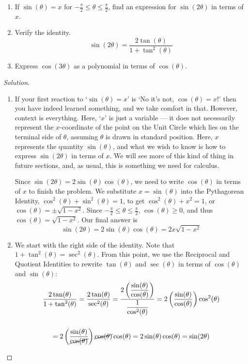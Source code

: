 \documentclass{ximera}
\begin{document}
\begin{example}
  \label{doubleangleex} $~$
  \begin{enumerate}
    \item If \( \sin(\theta) = x \) for \( -\frac{\pi}{2} \leq \theta \leq \frac{\pi}{2} \), find an expression for \( \sin(2\theta) \) in terms of \( x \).
    \item  \label{doubleanglesinewtan} Verify the identity.
    \[
      \sin(2\theta) = \frac{2\tan(\theta)}{1 + \tan^{2}(\theta)}
    \]
    \item \label{cosinepolynomial} Express \( \cos(3\theta) \) as a polynomial in terms of \( \cos(\theta) \).
  \end{enumerate}
  \begin{proof}[Solution]
    \begin{enumerate}
      \item If your first reaction to `\( \sin(\theta) = x \)' is `No it's not, \( \cos(\theta) = x \)!' then you have indeed learned something, and we take comfort in that.
      However, context is everything.
      Here, `\( x \)' is just a variable --- it does not necessarily represent the \( x \)-coordinate of the point on the Unit Circle which lies on the terminal side of \( \theta \), assuming \( \theta \) is drawn in standard position.
      Here, \( x \) represents the quantity \( \sin(\theta) \), and what we wish to know is how to express \( \sin(2\theta) \) in terms of \( x \).
      We will see more of this kind of thing in future sections, and, as usual, this is something we need for calculus.

      Since \( \sin(2\theta) = 2 \sin(\theta) \cos(\theta) \), we need to write \( \cos(\theta) \) in terms of \( x \) to finish the problem.
      We substitute \( x = \sin(\theta) \) into the Pythagorean Identity, \( \cos^{2}(\theta) + \sin^{2}(\theta) = 1 \), to get \( \cos^{2}(\theta) + x^2 = 1 \), or \( \cos(\theta) = \pm \sqrt{1 - x^2} \).
      Since \( -\frac{\pi}{2} \leq \theta \leq \frac{\pi}{2} \), \( \cos(\theta) \geq 0 \), and thus \( \cos(\theta) = \sqrt{1 - x^2} \).
      Our final answer is
      \[
        \boxed{\sin(2\theta) = 2 \sin(\theta)\cos(\theta) = 2x\sqrt{1 - x^2}}
      \]

      \item We start with the right side of the identity. Note that \( 1 + \tan^2(\theta) = \sec^2(\theta) \).
      From this point, we use the Reciprocal and Quotient Identities to rewrite \( \tan(\theta) \) and \( \sec(\theta) \) in terms of \( \cos(\theta) \) and \( \sin(\theta) \):
      \begin{multline*}
        \frac{2\tan(\theta)}{1 + \tan^{2}(\theta)} = \frac{2\tan(\theta)}{\sec^{2}(\theta)} = \frac{2\left(\dfrac{\sin(\theta)}{\cos(\theta)}\right)}{\dfrac{1}{\cos^{2}(\theta)}} = 2\left( \frac{\sin(\theta)}{\cos(\theta)}\right) \cos^{2}(\theta) \\[15pt]
				= 2\left( \frac{\sin(\theta)}{\cancel{\cos(\theta)}}\right) \cancel{\cos(\theta)} \cos(\theta) = 2\sin(\theta) \cos(\theta) = \sin(2\theta) 
      \end{multline*}
      

\end{enumerate}
\end{proof}
\end{example}
\end{document}
